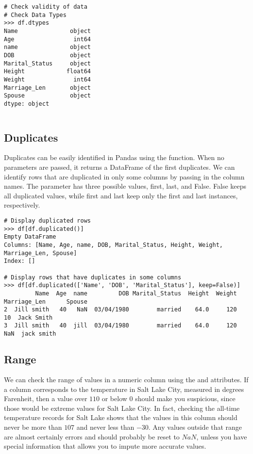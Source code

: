 \begin{lstlisting}
# Check validity of data
# Check Data Types
>>> df.dtypes
Name               object
Age                 int64
name               object
DOB                object
Marital_Status     object
Height            float64
Weight              int64
Marriage_Len       object
Spouse             object
dtype: object


\end{lstlisting}


\subsection*{Duplicates}
Duplicates can be easily identified in Pandas using the  function.
When no parameters are passed, it returns a DataFrame of the first duplicates.
We can identify rows that are duplicated in only some columns by passing in the column names.
The  parameter has three possible values, first, last, and False.
False keeps all duplicated values, while first and last keep only the first and last instances, respectively.

\begin{lstlisting}
# Display duplicated rows
>>> df[df.duplicated()]
Empty DataFrame
Columns: [Name, Age, name, DOB, Marital_Status, Height, Weight, Marriage_Len, Spouse]
Index: []

# Display rows that have duplicates in some columns
>>> df[df.duplicated(['Name', 'DOB', 'Marital_Status'], keep=False)]
         Name  Age  name         DOB Marital_Status  Height  Weight Marriage_Len      Spouse
2  Jill smith   40   NaN  03/04/1980        married    64.0     120           10  Jack Smith
3  Jill smith   40  jill  03/04/1980        married    64.0     120          NaN  jack smith
\end{lstlisting}

\subsection*{Range}
We can check the range of values in a numeric column using the  and  attributes.
If a column corresponds to the temperature in Salt Lake City, measured in degrees Farenheit, then a value over $110$ or below $0$ should make you suspicious, since those would be extreme values for Salt Lake City.
In fact, checking the all-time temperature records for Salt Lake shows that the values in this column should never be more than $107$ and never less than $-30$.
Any values outside that range are almost certainly errors and should probably be reset to $NaN$, unless you have special information that allows you to impute more accurate values.

